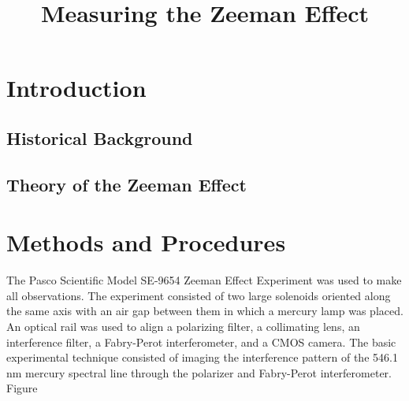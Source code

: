 \documentclass[twocolumn]{article}
\title{Measuring the Zeeman Effect}
\author{}
\begin{document}
\maketitle

\begin{abstract}
	
\end{abstract}

\section{Introduction} \label{sec:Intro}
	\subsection{Historical Background}

	\subsection{Theory of the Zeeman Effect} \label{sec:Theory}
		
\section{Methods and Procedures}
	The Pasco Scientific Model SE-9654 Zeeman Effect Experiment was used to make all observations.
	The experiment consisted of two large solenoids oriented along the same axis with an air gap between them in which a mercury lamp was placed.
	An optical rail was used to align a polarizing filter, a collimating lens, an interference filter, a Fabry-Perot interferometer, and a CMOS camera.
	The basic experimental technique consisted of imaging the interference pattern of the 546.1 nm mercury spectral line through the polarizer and Fabry-Perot interferometer.
	Figure 
	
\end{document}
